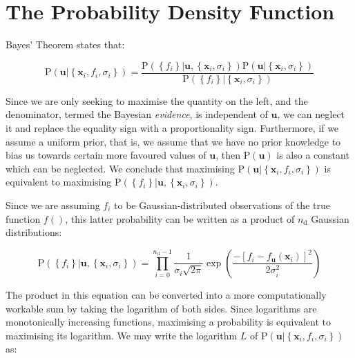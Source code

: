 \documentclass[a4paper,onecolumn,11pt]{book}
\begin{document}
\section{The Probability Density Function}
\label{bayes_pdf}

Bayes' Theorem states that:

\begin{equation}
\mathrm{P}\left( \mathbf{u} | \left\{ \mathbf{x}_i, f_i, \sigma_i \right\} \right) =
\frac{
\mathrm{P}\left( \left\{f_i \right\} | \mathbf{u}, \left\{ \mathbf{x}_i, \sigma_i \right\} \right)
\mathrm{P}\left( \mathbf{u} | \left\{ \mathbf{x}_i, \sigma_i \right\} \right)
}{
\mathrm{P}\left( \left\{f_i \right\} | \left\{ \mathbf{x}_i, \sigma_i \right\} \right)
}
\end{equation}

Since we are only seeking to maximise the quantity on the left, and the
denominator, termed the Bayesian \textit{evidence}, is independent of
$\mathbf{u}$, we can neglect it and replace the equality sign with a
proportionality sign.  Furthermore, if we assume a uniform prior, that is, we
assume that we have no prior knowledge to bias us towards certain more favoured
values of $\mathbf{u}$, then $\mathrm{P}\left( \mathbf{u} \right)$ is also a
constant which can be neglected. We conclude that maximising $\mathrm{P}\left(
\mathbf{u} | \left\{ \mathbf{x}_i, f_i, \sigma_i \right\} \right)$ is
equivalent to maximising $\mathrm{P}\left( \left\{f_i \right\} | \mathbf{u},
\left\{ \mathbf{x}_i, \sigma_i \right\} \right)$.

Since we are assuming $f_i$ to be Gaussian-distributed observations of the true
function $f()$, this latter probability can be written as a product of
$n_\mathrm{d}$ Gaussian distributions:

\begin{equation}
\mathrm{P}\left( \left\{f_i \right\} | \mathbf{u}, \left\{ \mathbf{x}_i, \sigma_i \right\} \right)
=
\prod_{i=0}^{n_\mathrm{d}-1} \frac{1}{\sigma_i\sqrt{2\pi}} \exp \left(
\frac{
-\left[f_i - f_\mathbf{u}(\mathbf{x}_i)\right]^2
}{
2 \sigma_i^2
} \right)
\end{equation}

The product in this equation can be converted into a more computationally
workable sum by taking the logarithm of both sides. Since logarithms are
monotonically increasing functions, maximising a probability is equivalent to
maximising its logarithm. We may write the logarithm $L$ of $\mathrm{P}\left(
\mathbf{u} | \left\{ \mathbf{x}_i, f_i, \sigma_i \right\} \right)$ as:
\end{document}
